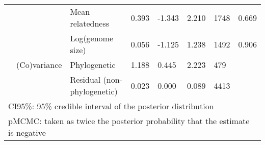 \begin{table}
\begin{tabular}[t]{llllllll}
\hspace{1em} &  & Mean relatedness & 0.393 & -1.343 & 2.210 & 1748 & 0.669\\
\hspace{1em} &  & Log(genome size) & 0.056 & -1.125 & 1.238 & 1492 & 0.906\\
\hspace{1em} & (Co)variance & Phylogenetic & 1.188 & 0.445 & 2.223 & 479 & \\
\hspace{1em} &  & Residual (non-phylogenetic) & 0.023 & 0.000 & 0.089 & 4413 & \\
\bottomrule
\multicolumn{8}{l}{\textsuperscript{} CI95\%: 95\% credible interval of the posterior distribution}\\
\multicolumn{8}{l}{\textsuperscript{} pMCMC: taken as twice the posterior probability that the estimate is negative}\\
\end{tabular}
\end{table}
